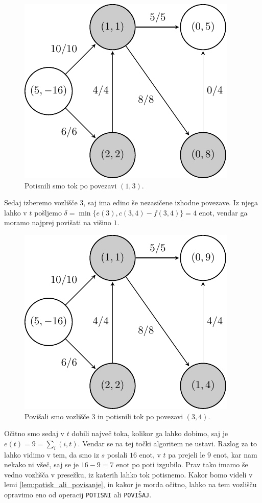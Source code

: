 \documentclass[mat1]{fmfdelo}
\begin{document}
\begin{figure}[H]
  \centering
  \includegraphics{images/graf2-5.pdf}
  \caption{Potisnili smo tok po povezavi $(1,3)$.}
\end{figure}

Sedaj izberemo vozlišče $3$, saj ima edino še nezasičene izhodne povezave. Iz njega lahko v $t$ pošljemo $\delta = \min\{e(3), c(3,4) - f(3,4)\} = 4$ enot,
vendar ga moramo najprej povišati na višino $1$.

\begin{figure}[H]
  \centering
  \includegraphics{images/graf2-6.pdf}
  \caption{Povišali smo vozlišče $3$ in potisnili tok po povezavi $(3,4)$.}
\end{figure}

Očitno smo sedaj v $t$ dobili največ toka, kolikor ga lahko dobimo, saj je $e(t) = 9 = \sum_i (i,t)$. Vendar se na tej točki algoritem ne ustavi. Razlog za to
lahko vidimo v tem, da smo iz $s$ poslali $16$ enot, v $t$ pa prejeli le $9$ enot, kar nam nekako ni všeč, saj se je $16-9 = 7$ enot po poti izgubilo. Prav tako
imamo še vedno vozlišča v presežku, iz katerih lahko tok potisnemo. Kakor bomo videli v lemi \ref{lem:potisk_ali_povisanje}, in kakor je morda očitno, lahko na tem
vozlišču opravimo eno od operacij \texttt{POTISNI} ali \texttt{POVIŠAJ}.
\end{document}
